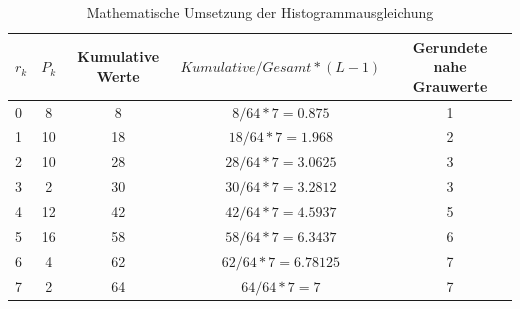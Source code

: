 \documentclass[a4paper,12pt,oneside]{article}
\begin{document}
  \begin{table}
  [h]
  \caption{Mathematische Umsetzung der Histogrammausgleichung}
  \centering
  \begin{tabular}{|l|c|c|c|c|}
  \hline
  $r_{k}$ & $P_{k}$ & Kumulative Werte & $Kumulative/Gesamt*(L-1)$ & Gerundete nahe Grauwerte\\
  \hline
  0 & 8 & 8 & $8/64*7=0.875$ & 1\\
  \hline
  1 & 10 & 18 & $18/64*7=1.968$ & 2\\
  \hline
  2 & 10 & 28 & $28/64*7=3.0625$ & 3\\
  \hline
  3 & 2 & 30 & $30/64*7=3.2812$ & 3\\
  \hline
  4 & 12 & 42 & $42/64*7=4.5937$ & 5\\
  \hline
  5 & 16 & 58 & $58/64*7=6.3437$ & 6\\
  \hline
  6 & 4 & 62 & $62/64*7=6.78125$ & 7\\
  \hline
  7 & 2 & 64 & $64/64*7=7$ & 7\\
  \hline
  \end{tabular}
  \end{table}
\end{document}
